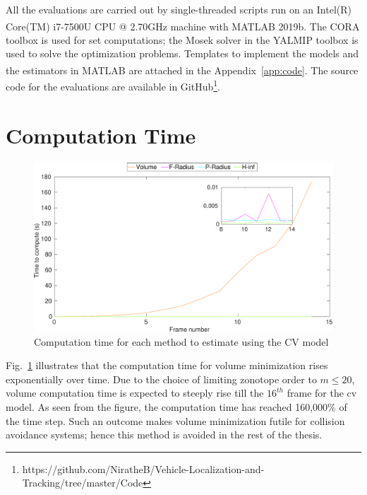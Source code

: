 All the evaluations are carried out by single-threaded scripts run on an Intel(R) Core(TM) i7-7500U CPU @ 2.70GHz machine with MATLAB\textsuperscript{\tiny\textregistered} 2019b. The CORA toolbox is used for set computations; the Mosek solver in the YALMIP toolbox is used to solve the optimization problems. Templates to implement the models and the estimators in MATLAB\textsuperscript{\tiny\textregistered} are attached in the Appendix~\ref{app:code}. The source code for the evaluations are available in GitHub\footnote{https://github.com/NiratheB/Vehicle-Localization-and-Tracking/tree/master/Code}.

\section{Computation Time}
\begin{figure}[H]
\centering
\includegraphics[width=\linewidth]{figures/timegraphh}
\caption{Computation time for each method to estimate using the CV model}
\label{fig:timegraph}
\end{figure}
Fig.~\ref{fig:timegraph} illustrates that the computation time for volume minimization rises exponentially over time. Due to the choice of limiting zonotope order to $m\leq20$, volume computation time is expected to steeply rise till the $16^{th}$ frame for the cv model. As seen from the figure, the computation time has reached 160,000\% of the time step. Such an outcome makes volume minimization futile for collision avoidance systems; hence this method is avoided in the rest of the thesis.

